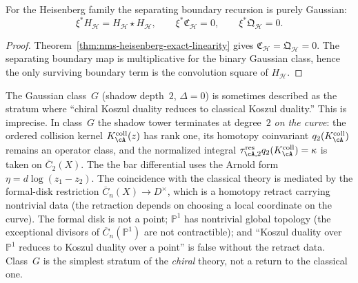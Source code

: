 \begin{corollary}
\label{cor:nms-heisenberg-gaussian-boundary}
For the Heisenberg family the separating boundary recursion is purely Gaussian:
\[
\xi^*H_{\mathcal H}=H_{\mathcal H}\star H_{\mathcal H},
\qquad
\xi^*\mathfrak C_{\mathcal H}=0,
\qquad
\xi^*\mathfrak Q_{\mathcal H}=0.
\]
\end{corollary}

\begin{proof}
Theorem~\ref{thm:nms-heisenberg-exact-linearity} gives
$\mathfrak C_{\mathcal H}=\mathfrak Q_{\mathcal H}=0$. The separating
boundary map is multiplicative for the binary Gaussian class, hence
the only surviving boundary term is the convolution square of
$H_{\mathcal H}$.
\end{proof}

\begin{remark}
\label{rem:nms-class-g-not-over-a-point}
The Gaussian class~$G$ (shadow depth~$2$, $\Delta = 0$) is
sometimes described as the stratum where ``chiral Koszul duality
reduces to classical Koszul duality.'' This is imprecise.
In class~$G$ the shadow tower terminates at degree~$2$
\emph{on the curve}: the ordered collision kernel
$K_\cA^{\mathrm{coll}}(z)$ has rank one, its homotopy coinvariant
$q_2(K_\cA^{\mathrm{coll}})$ remains an operator class, and the
normalized integral
$\tau_{\cA,2}^{\mathrm{res}}q_2(K_\cA^{\mathrm{coll}})=\kappa$
is taken on $\overline{C}_2(X)$. The
the bar differential uses the Arnold form
$\eta = d\log(z_1 - z_2)$. The coincidence with the
classical theory is mediated by the formal-disk restriction
$\overline{C}_n(X) \to D^{\times}$, which is a homotopy
retract carrying nontrivial data (the retraction depends on
choosing a local coordinate on the curve).
The formal disk is not a point; $\mathbb{P}^1$ has nontrivial
global topology (the exceptional divisors of $\overline{C}_n(\mathbb{P}^1)$
are not contractible); and ``Koszul duality over $\mathbb{P}^1$
reduces to Koszul duality over a point'' is false without the
retract data. Class~$G$ is the simplest stratum of the
\emph{chiral} theory, not a return to the classical one.
\end{remark}

